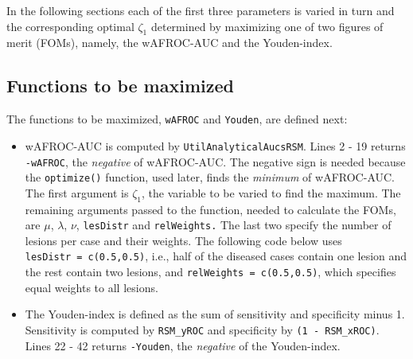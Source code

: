 \documentclass[
]{book}
\begin{document}
In the following sections each of the first three parameters is varied in turn and the corresponding optimal \(\zeta_1\) determined by maximizing one of two figures of merit (FOMs), namely, the wAFROC-AUC and the Youden-index.

\hypertarget{functions-to-be-maximized}{%
\subsection{Functions to be maximized}\label{functions-to-be-maximized}}

The functions to be maximized, \texttt{wAFROC} and \texttt{Youden}, are defined next:

\begin{itemize}
\item
  wAFROC-AUC is computed by \texttt{UtilAnalyticalAucsRSM}. Lines 2 - 19 returns \texttt{-wAFROC}, the \emph{negative} of wAFROC-AUC. The negative sign is needed because the \texttt{optimize()} function, used later, finds the \emph{minimum} of wAFROC-AUC. The first argument is \(\zeta_1\), the variable to be varied to find the maximum. The remaining arguments passed to the function, needed to calculate the FOMs, are \(\mu\), \(\lambda\), \(\nu\), \texttt{lesDistr} and \texttt{relWeights.} The last two specify the number of lesions per case and their weights. The following code below uses \texttt{lesDistr\ =\ c(0.5,0.5)}, i.e., half of the diseased cases contain one lesion and the rest contain two lesions, and \texttt{relWeights\ =\ c(0.5,0.5)}, which specifies equal weights to all lesions.
\item
  The Youden-index is defined as the sum of sensitivity and specificity minus 1. Sensitivity is computed by \texttt{RSM\_yROC} and specificity by \texttt{(1\ -\ RSM\_xROC)}. Lines 22 - 42 returns \texttt{-Youden}, the \emph{negative} of the Youden-index.
\end{itemize}
\end{document}

